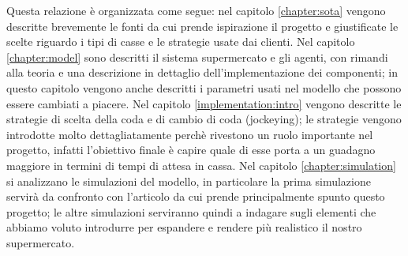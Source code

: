 Questa relazione è organizzata come segue: nel capitolo \ref{chapter:sota} vengono descritte brevemente le fonti da cui prende ispirazione il progetto e giustificate le scelte riguardo i tipi di casse e le strategie usate dai clienti. Nel capitolo \ref{chapter:model} sono descritti il sistema supermercato e gli agenti, con rimandi alla teoria e una descrizione in dettaglio dell'implementazione dei componenti; in questo capitolo vengono anche descritti i parametri usati nel modello che possono essere cambiati a piacere. Nel capitolo \ref{implementation:intro} vengono descritte le strategie di scelta della coda e di cambio di coda (jockeying); le strategie vengono introdotte molto dettagliatamente perchè rivestono un ruolo importante nel progetto, infatti l'obiettivo finale è capire quale di esse porta a un guadagno maggiore in termini di tempi di attesa in cassa. Nel capitolo \ref{chapter:simulation} si analizzano le simulazioni del modello, in particolare la prima simulazione servirà da confronto con l'articolo da cui prende principalmente spunto questo progetto; le altre simulazioni serviranno quindi a indagare sugli elementi che abbiamo voluto introdurre per espandere e rendere più realistico il nostro supermercato.
